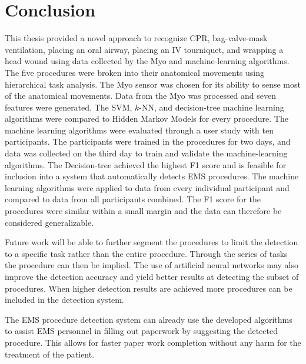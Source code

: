 
\chapter{Conclusion}
\label{ch:Conclusion}

This thesis provided a novel approach to recognize CPR, bag-valve-mask ventilation, placing an oral airway, placing an IV tourniquet, and wrapping a head wound using data collected by the Myo and machine-learning algorithms. The five procedures were broken into their anatomical movements using hierarchical task analysis. The Myo sensor was chosen for its ability to sense most of the anatomical movements. Data from the Myo was processed and seven features were generated. The SVM, $k$-NN, and decision-tree machine learning algorithms were compared to Hidden Markov Models for every procedure. The machine learning algorithms were evaluated through a user study with ten participants. The participants were trained in the procedures for two days, and data was collected on the third day to train and validate the machine-learning algorithms. The Decision-tree achieved the highest F1 score and is feasible for inclusion into a system that automatically detects EMS procedures. The machine learning algorithms were applied to data from every individual participant and compared to data from all participants combined. The F1 score for the procedures were similar within a small margin and the data can therefore be considered generalizable.
\par Future work will be able to further segment the procedures to limit the detection to a specific task rather than the entire procedure. Through the series of tasks the procedure can then be implied. The use of artificial neural networks may also improve the detection accuracy and yield better results at detecting the subset of procedures. When higher detection results are achieved more procedures can be included in the detection system.
\par The EMS procedure detection system can already use the developed algorithms to assist EMS personnel in filling out paperwork by suggesting the detected procedure. This allows for faster paper work completion without any harm for the treatment of the patient.